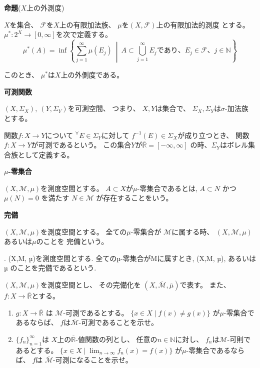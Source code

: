 \documentclass[12pt,b5paper]{ltjsarticle}
\begin{document}
\textbf{命題}($X$上の外測度)

$X$を集合、
$\mathcal{F}$を$X$上の有限加法族、
$\mu$を$(X,\mathcal{F})$上の有限加法的測度
とする。
$\mu^{*}:2^{X}\to [0,\infty]$を次で定義する。
\begin{equation}
 \mu^{*}(A)
  = \inf\left\{
         \sum_{j=1}^{\infty}\mu(E_{j})
         \ \middle| \
         A \subset \bigcup_{j=1}^{\infty}E_{j}
         であり、
         E_{j}\in\mathcal{F}
         、j\in\mathbb{N}
        \right\}
\end{equation}

このとき、
$\mu^{*}$は$X$上の外側度である。


\textbf{可測関数}

$(X,\Sigma_{X}), \: (Y,\Sigma_{Y})$を可測空間、
つまり、
$X,Y$は集合で、
$\Sigma_{X},\Sigma_{Y}$は$\sigma$-加法族
とする。

関数$f: X\to Y$について
${}^{\forall}E\in \Sigma_{Y}$に対して
$f^{-1}(E)\in\Sigma_{X}$が成り立つとき、
関数$f: X\to Y$が可測であるという。
この集合$Y$が$\overline{\mathbb{R}}=[-\infty,\infty]$
の時、$\Sigma_{Y}$はボレル集合族として定義する。



\textbf{$\mu$-零集合}

$(X, \mathcal{M}, \mu)$を測度空間とする。
$A\subset X$が$\mu$-零集合であるとは,
$A\subset N$
かつ
$\mu(N) = 0$
を満たす
$ N\in \mathcal{M}$
が存在することをいう。


\textbf{完備}

$(X, \mathcal{M}, \mu)$を測度空間とする。
全ての$\mu$-零集合が
$\mathcal{M}$に属する時、
$(X, \mathcal{M}, \mu)$
あるいは$\mu$のことを
完備という。

. (X,M, µ)を測度空間とする. 全てのµ-零集合がMに属すとき, (X,M, µ),
あるいは µ のことを完備であるという.






\hrulefill

$(X,\mathcal{M},\mu)$を測度空間とし、
その完備化を
$(X,\overline{\mathcal{M}},\overline{\mu})$で表す。
また、$f:X\to \overline{\mathbb{R}}$とする。

\begin{enumerate}
 \item
      $g: X\to \overline{\mathbb{R}}$
      は
      $\mathcal{M}$-可測であるとする。
      $\{ x\in X \mid f(x)\ne g(x)\}$
      が$\mu$-零集合で
      あるならば、
      $f$は$\overline{\mathcal{M}}$-可測であることを示せ。


 \item
      $\{ f_{n} \}_{n=1}^{\infty}$は
      $X$上の$\overline{\mathbb{R}}$-値関数の列とし、
      任意の$n\in\mathbb{N}$に対し、
      $f_{n}$は$\mathcal{M}$-可則であるとする。
      $\{ x\in X \mid \lim_{n\to\infty}f_{n}(x)=f(x) \}$
      が$\mu$-零集合であるならば、
      $f$は
      $\overline{\mathcal{M}}$-可測になることを示せ。
\end{enumerate}



\dotfill






\hrulefill
\end{document}
